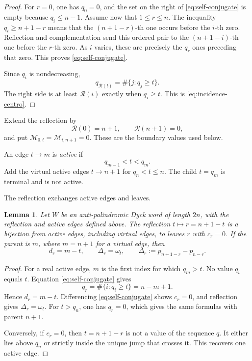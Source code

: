 \documentclass[11pt]{article}
\newtheorem{lemma}[theorem]{Lemma}
\theoremstyle{definition}
\theoremstyle{remark}
\begin{document}
\begin{proof}
For \(r=0\), one has \(q_0=0\), and the set on the right of
\eqref{eq:self-conjugate} is empty because \(q_i\leq n-1\).  Assume now that
\(1\leq r\leq n\).
The inequality \(q_i\geq n+1-r\) means that the \((n+1-r)\)-th one occurs
before the \(i\)-th zero.  Reflection and complementation send this ordered
pair to the \((n+1-i)\)-th one before the \(r\)-th zero.  As \(i\) varies,
these are precisely the \(q_r\) ones preceding that zero.  This proves
\eqref{eq:self-conjugate}.

Since \(q_i\) is nondecreasing,
\[
 q_{\mathcal R(t)}=\#\{j:q_j\geq t\}.
\]
The right side is at least \(\mathcal R(i)\) exactly when \(q_i\geq t\).
This is \eqref{eq:incidence-centro}.
\end{proof}

Extend the reflection by
\[
 \mathcal R(0)=n+1,
 \qquad \mathcal R(n+1)=0,
\]
and put \(\mathcal M_{0,t}=\mathcal M_{i,n+1}=0\).  These are the boundary values used below.

An edge \(t\to m\) is \emph{active} if
\[
 q_{m-1}<t<q_m.
\]
Add the virtual active edges \(t\to n+1\) for \(q_n<t\leq n\).  The child
\(t=q_m\) is terminal and is not active.

The reflection exchanges active edges and leaves.
\begin{lemma}
\label{lem:edge-leaf}
Let \(W\) be an anti-palindromic Dyck word of length \(2n\), with the
reflection and active edges defined above.
The reflection \(t\mapsto r=n+1-t\) is a bijection from active edges,
including virtual edges, to leaves \(r\) with \(c_r=0\).  If the parent is
\(m\), where \(m=n+1\) for a virtual edge, then
\begin{equation*}
 d_r=m-t,
 \qquad
 \Delta_r=\omega_t,
 \qquad
 \Delta_r:=p_{n+1-r}-p_{n-r}.
\end{equation*}
\end{lemma}

\begin{proof}
For a real active edge, \(m\) is the first index for which \(q_m>t\).  No
value \(q_i\) equals \(t\).  Equation \eqref{eq:self-conjugate} gives
\[
 q_r=\#\{i:q_i\geq t\}=n-m+1.
\]
Hence \(d_r=m-t\).  Differencing \eqref{eq:self-conjugate} shows \(c_r=0\),
and reflection gives \(\Delta_r=\omega_t\).  For \(t>q_n\), one has \(q_r=0\),
which gives the same formulas with parent \(n+1\).

Conversely, if \(c_r=0\), then \(t=n+1-r\) is not a value of the sequence
\(q\).  It either lies above \(q_n\) or strictly inside the unique jump that
crosses it.  This recovers one active edge.
\end{proof}
\end{document}
